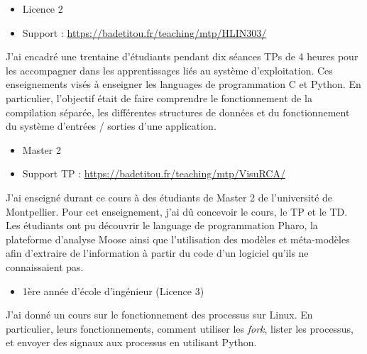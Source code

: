 \documentclass[10pt,a4paper,ragged2e,withhyper]{altacv}
\begin{document}
\divider
\pagebreak

\begin{itemize}
  \item Licence 2
  \item Support : \url{https://badetitou.fr/teaching/mtp/HLIN303/}
\end{itemize}
J'ai encadré une trentaine d'étudiants pendant dix séances TPs de 4 heures pour les accompagner dans les apprentissages liés au système d'exploitation.
Ces enseignements visés à enseigner les languages de programmation C et Python.
En particulier, l'objectif était de faire comprendre le fonctionnement de la compilation séparée,
les différentes structures de données
et du fonctionnement du système d'entrées / sorties d'une application.


\divider


\begin{itemize}
\item Master 2
\item Support TP : \url{https://badetitou.fr/teaching/mtp/VisuRCA/}
\end{itemize}

J'ai enseigné durant ce cours à des étudiants de Master 2 de l'université de Montpellier.
Pour cet enseignement, j'ai dû concevoir le cours, le TP et le TD.
Les étudiants ont pu découvrir le language de programmation Pharo, la plateforme d'analyse Moose ainsi que l'utilisation des modèles et méta-modèles afin d'extraire de l'information à partir du code d'un logiciel qu'ils ne connaissaient pas.

\divider


\begin{itemize}
\item 1ère année d'école d'ingénieur (Licence 3)
\end{itemize}

J'ai donné un cours sur le fonctionnement des processus sur Linux.
En particulier, leurs fonctionnements, comment utiliser les \textit{fork}, lister les processus, et envoyer des signaux aux processus en utilisant Python.
\end{document}
